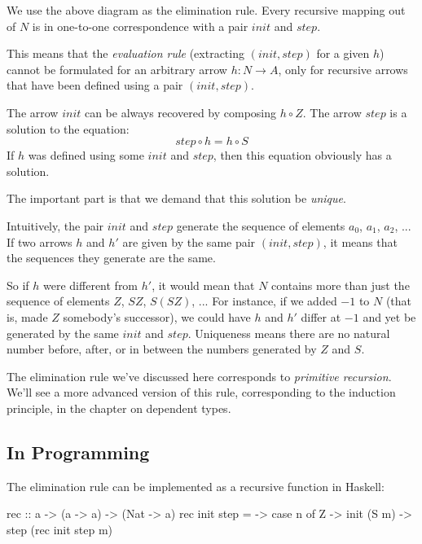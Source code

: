 \documentclass[DaoFP]{subfiles}
\begin{document}
We use the above diagram as the elimination rule. Every recursive mapping out of $N$ is in one-to-one correspondence with a pair $\mathit{init}$ and $\mathit{step}$. 


This means that the \emph{evaluation rule} (extracting $(\mathit{init}, \mathit{step})$ for a given $h$) cannot be formulated for an arbitrary arrow $h \colon N \to A$, only for recursive arrows that have been defined using a pair $(\mathit{init}, \mathit{step})$. 

The arrow $\mathit{init}$ can be always recovered by composing $h \circ Z$. The arrow $\mathit{step}$ is a solution to the equation:
\[ \mathit{step} \circ h = h \circ S \]
If $h$ was defined using some $\mathit{init}$ and $\mathit{step}$, then this equation obviously has a solution. 

The important part is that we demand that this solution be \emph{unique}. 

Intuitively, the pair $\mathit{init}$ and $\mathit{step}$ generate the sequence of elements $a_0$, $a_1$, $a_2$, ... If two arrows $h$ and $h'$ are given by the same pair $(\mathit{init}, \mathit{step})$, it means that the sequences they generate are the same. 

So if $h$ were different from $h'$, it would mean that $N$ contains more than just the sequence of elements $Z$, $S Z$, $S(S Z)$, ... For instance, if we added $-1$ to $N$ (that is, made $Z$ somebody's successor), we could have $h$ and $h'$ differ at $-1$ and yet be generated by the same $\mathit{init}$ and $\mathit{step}$. Uniqueness means there are no natural number before, after, or in between the numbers generated by $Z$ and $S$.

The elimination rule we've discussed here corresponds to \emph{primitive recursion}. We'll see a more advanced version of this rule, corresponding to the induction principle, in the chapter on dependent types.

\subsection{In Programming}

The elimination rule can be implemented as a recursive function in Haskell:

\begin{haskell}
rec :: a -> (a -> a) -> (Nat -> a)
rec init step = \n ->
  case n of
    Z     -> init
    (S m) -> step (rec init step m)
\end{haskell}
\end{document}

